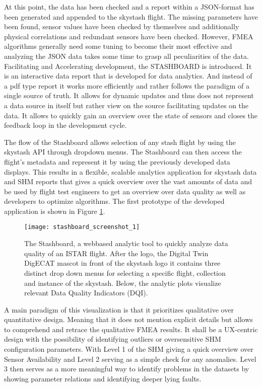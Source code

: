 At this point, the data has been checked and a report within a JSON-format has been generated and appended to the skystash flight. The missing parameters have been found, sensor values have been checked by themselves and additionally physical correlations and redundant sensors have been checked. However, FMEA algorithms generally need some tuning to become their most effective and analyzing the JSON data takes some time to grasp all peculiarities of the data. Facilitating and Accelerating development, the STASHBOARD is introduced. It is an interactive data report that is developed for data analytics. And instead of a pdf type report it works more efficiently and rather follows the paradigm of a single source of truth. It allows for dynamic updates and thus does not represent a data source in itself but rather view on the source facilitating updates on the data. It allows to quickly gain an overview over the state of sensors and closes the feedback loop in the development cycle.

The flow of the Stashboard allows selection of any stash flight by using the skystash API through dropdown menus. The Stashboard can then access the flight's metadata and represent it by using the previously developed data displays.
This results in a flexible, scalable analytics application for skystash data and SHM reports that gives a quick overview over the vast amounts of data and be used by flight test engineers to get an overview over data quality as well as developers to optimize algorithms. The first prototype of the developed application is shown in Figure \ref{fig:stashboard}.

\begin{figure}[!h]
    \centering
    \texttt{[image: stashboard\_screenshot\_1]}
    \caption[Visualization: Stashboard Screenshot]{The Stashboard, a webbased analytic tool to quickly analyze data quality of an ISTAR flight. After the logo, the Digital Twin DigECAT mascot in front of the skystash logo it contains three distinct drop down menus for selecting a specific flight, collection and instance of the skystash. Below, the analytic plots visualize relevant Data Quality Indicators (DQI).}
    \label{fig:stashboard}
\end{figure}
A main paradigm of this visualization is that it prioritizes qualitative over quantitative design. Meaning that it does not mention explicit details but allows to comprehend and retrace the qualitative FMEA results. It shall be a UX-centric design with the possibility of identifying outliers or oversensitive SHM configuration parameters. With Level 1 of the SHM giving a quick overview over Sensor Availability and Level 2 serving as a simple check for any anomalies. Level 3 then serves as a more meaningful way to identify problems in the datasets by showing parameter relations and identifying deeper lying faults.

